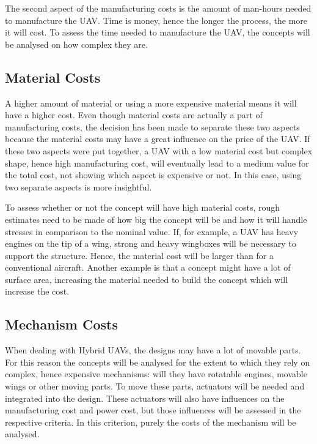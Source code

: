 The second aspect of the manufacturing costs is the amount of man-hours needed to manufacture the UAV. Time is money, hence the longer the process, the more it will cost. To assess the time needed to manufacture the UAV, the concepts will be analysed on how complex they are.

\subsection{Material Costs} 
\label{sec:matcost}

A higher amount of material or using a more expensive material means it will have a higher cost. Even though material costs are actually a part of manufacturing costs, the decision has been made to separate these two aspects because the material costs may have a great influence on the price of the UAV. If these two aspects were put together, a UAV with a low material cost but complex shape, hence high manufacturing cost, will eventually lead to a medium value for the total cost, not showing which aspect is expensive or not. In this case, using two separate aspects is more insightful. 

To assess whether or not the concept will have high material costs, rough estimates need to be made of how big the concept will be and how it will handle stresses in comparison to the nominal value. If, for example, a UAV has heavy engines on the tip of a wing, strong and heavy wingboxes will be necessary to support the structure. Hence, the material cost will be larger than for a conventional aircraft. Another example is that a concept might have a lot of surface area, increasing the material needed to build the concept which will increase the cost.

\subsection{Mechanism Costs}
\label{sec:mechcost}

When dealing with Hybrid UAVs, the designs may have a lot of movable parts. For this reason the concepts will be analysed for the extent to which they rely on complex, hence expensive mechanisms: will they have rotatable engines, movable wings or other moving parts. To move these parts, actuators will be needed and integrated into the design. These actuators will also have influences on the manufacturing cost and power cost, but those influences will be assessed in the respective criteria. In this criterion, purely the costs of the mechanism will be analysed.

